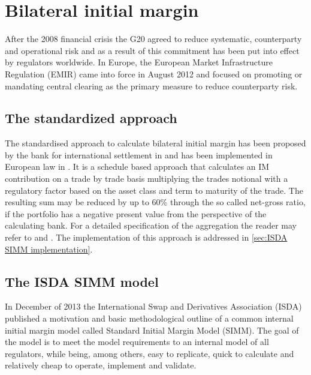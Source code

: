 \documentclass[../Thesis_AHoecherl.tex]{subfiles}
\begin{document}
    \section{Bilateral initial margin}\label{Bilateral initial margin}
    
    After the 2008 financial crisis the G20 agreed to reduce systematic, counterparty and operational risk and as a result of this commitment has been put into effect by regulators worldwide. In Europe, the European Market Infrastructure Regulation (EMIR) came into force in August 2012 and focused on promoting or mandating central clearing as the primary measure to reduce counterparty risk.

    \subsection{The standardized approach}\label{The standard approach}

    The standardised approach to calculate bilateral initial margin has been proposed by the bank for international settlement in \cite[Requirement 3.5 and 3.6]{BCBS_MarginRequirements} and has been implemented in European law in \cite{OTC_Margin_EU_Regulation}. It is a schedule based approach that calculates an \gls{IM} contribution on a trade by trade basis multiplying the trades notional with a regulatory factor based on the asset class and term to maturity of the trade.
    The resulting sum may be reduced by up to 60\% through the so called net-gross ratio, if the portfolio has a negative present value from the perspective of the calculating bank.
    For a detailed specification of the aggregation the reader may refer to \cite{BCBS_MarginRequirements} and \cite{OTC_Margin_EU_Regulation}. The implementation of this approach is addressed in \ref{sec:ISDA SIMM implementation}.
    
    \subsection{The ISDA SIMM model}\label{sec:The ISDA-SIMM model}
    In December of 2013 the International Swap and Derivatives Association (ISDA) published a motivation and basic methodological outline of a common internal initial margin model called Standard Initial Margin Model (SIMM\texttrademark)\cite{ISDADec2013}. The goal of the model is to meet the model requirements to an internal model of all regulators, while being, among others, easy to replicate, quick to calculate and relatively cheap to operate, implement and validate.
\end{document}
